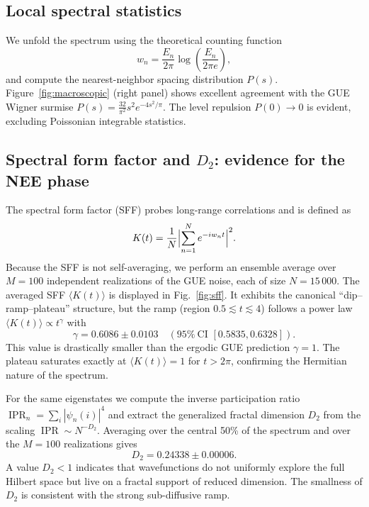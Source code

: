 \documentclass[11pt,a4paper]{article}
\DeclareMathOperator{\IPR}{IPR}
\begin{document}
\subsection{Local spectral statistics}

We unfold the spectrum using the theoretical counting function
\begin{equation}
w_n = \frac{E_n}{2\pi}\log\left(\frac{E_n}{2\pi e}\right),
\end{equation}
and compute the nearest-neighbor spacing distribution $P(s)$. Figure~\ref{fig:macroscopic} (right panel) shows excellent agreement with the GUE Wigner surmise $P(s) = \frac{32}{\pi^2}s^2 e^{-4s^2/\pi}$. The level repulsion $P(0)\to0$ is evident, excluding Poissonian integrable statistics.

\subsection{Spectral form factor and \texorpdfstring{$D_2$}{D2}: evidence for the NEE phase}

The spectral form factor (SFF) probes long-range correlations and is defined as
\begin{equation}
K(t) = \frac{1}{N}\Bigl|\sum_{n=1}^N e^{-i w_n t}\Bigr|^2.
\end{equation}
Because the SFF is not self-averaging, we perform an ensemble average over $M=100$ independent realizations of the GUE noise, each of size $N=15\,000$. The averaged SFF $\langle K(t)\rangle$ is displayed in Fig.~\ref{fig:sff}. It exhibits the canonical ``dip--ramp--plateau'' structure, but the ramp (region $0.5 \lesssim t \lesssim 4$) follows a power law $\langle K(t)\rangle \propto t^\gamma$ with
\begin{equation}
\gamma = 0.6086 \pm 0.0103 \quad (95\%\ \text{CI } [0.5835,0.6328]).
\end{equation}
This value is drastically smaller than the ergodic GUE prediction $\gamma=1$. The plateau saturates exactly at $\langle K(t)\rangle =1$ for $t>2\pi$, confirming the Hermitian nature of the spectrum.

For the same eigenstates we compute the inverse participation ratio $\IPR_n = \sum_i |\psi_n(i)|^4$ and extract the generalized fractal dimension $D_2$ from the scaling $\IPR \sim N^{-D_2}$. Averaging over the central 50\% of the spectrum and over the $M=100$ realizations gives
\begin{equation}
D_2 = 0.24338 \pm 0.00006.
\end{equation}
A value $D_2 < 1$ indicates that wavefunctions do not uniformly explore the full Hilbert space but live on a fractal support of reduced dimension. The smallness of $D_2$ is consistent with the strong sub-diffusive ramp.
\end{document}
